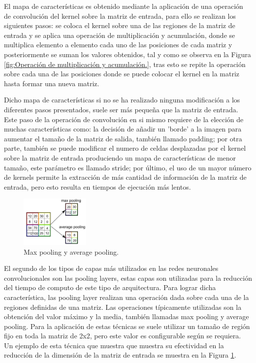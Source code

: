 El mapa de características es obtenido mediante la aplicación de una operación de convolución del kernel sobre la matriz de entrada, para ello se realizan los siguientes pasos: se coloca el kernel sobre una de las regiones de la matriz de entrada y se aplica una operación de multiplicación y acumulación, donde se multiplica elemento a elemento cada uno de las posiciones de cada matriz y posteriormente se suman los valores obtenidos, tal y como se observa en la Figura \ref{fig:Operación de multiplicación y acumulación.}, tras esto se repite la operación sobre cada una de las posiciones donde se puede colocar el kernel en la matriz hasta formar una nueva matriz.

Dicho mapa de características si no se ha realizado ninguna modificación a los diferentes pasos presentados, suele ser más pequeña que la matriz de entrada. Este paso de la operación de convolución en si mismo requiere de la elección de muchas características como: la decisión de añadir un 'borde' a la imagen para aumentar el tamaño de la matriz de salida, también llamado padding; por otra parte, también se puede modificar el numero de celdas desplazadas por el kernel sobre la matriz de entrada produciendo un mapa de características de menor tamaño, este parámetro es llamado stride; por último, el uso de un mayor número de kernels permite la extracción de más cantidad de información de la matriz de entrada, pero esto resulta en tiempos de ejecución más lentos.

\begin{figure}[H]
    \centering
    \includegraphics[width=0.3\textwidth]{Book/figures/5_deteccion2d/pooling.jpeg}
    \caption{Max pooling y average pooling.}
    \label{fig:Max pooling y average pooling.}
\end{figure}

El segundo de los tipos de capas más utilizados en las redes neuronales convolucionales son las pooling layers, estas capas son utilizadas para la reducción del tiempo de computo de este tipo de arquitectura. Para lograr dicha característica, las pooling layer realizan una operación dada sobre cada una de la regiones definidas de una matriz. Las operaciones típicamente utilizadas son la obtención del valor máximo y la media, también llamadas max pooling y average pooling. Para la aplicación de estas técnicas se suele utilizar un tamaño de región fijo en toda la matriz de 2x2, pero este valor es configurable según se requiera. Un ejemplo de esta técnica que muestra que muestra su efectividad en la reducción de la dimensión de la matriz de entrada se muestra en la Figura \ref{fig:Max pooling y average pooling.}.

